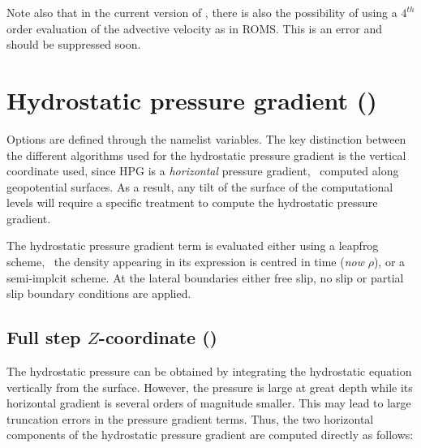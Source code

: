 \documentclass[../main/NEMO_manual]{subfiles}
\begin{document}
Note also that in the current version of ,
there is also the possibility of using a $4^{th}$ order evaluation of the advective velocity as in ROMS.
This is an error and should be suppressed soon.

\section[Hydrostatic pressure gradient (\textit{dynhpg.F90})]{Hydrostatic pressure gradient (\protect{})}
\label{sec:DYN_hpg}

\begin{listing}
  \caption{}
  \label{lst:namdyn_hpg}
\end{listing}

Options are defined through the  namelist variables.
The key distinction between the different algorithms used for
the hydrostatic pressure gradient is the vertical coordinate used,
since HPG is a \emph{horizontal} pressure gradient, \ie\ computed along geopotential surfaces.
As a result, any tilt of the surface of the computational levels will require a specific treatment to
compute the hydrostatic pressure gradient.

The hydrostatic pressure gradient term is evaluated either using a leapfrog scheme,
\ie\ the density appearing in its expression is centred in time (\emph{now} $\rho$),
or a semi-implcit scheme.
At the lateral boundaries either free slip, no slip or partial slip boundary conditions are applied.

\subsection[Full step $Z$-coordinate (\forcode{ln_dynhpg_zco})]{Full step $Z$-coordinate (\protect{})}
\label{subsec:DYN_hpg_zco}

The hydrostatic pressure can be obtained by integrating the hydrostatic equation vertically from the surface.
However, the pressure is large at great depth while its horizontal gradient is several orders of magnitude smaller.
This may lead to large truncation errors in the pressure gradient terms.
Thus, the two horizontal components of the hydrostatic pressure gradient are computed directly as follows:
\end{document}
